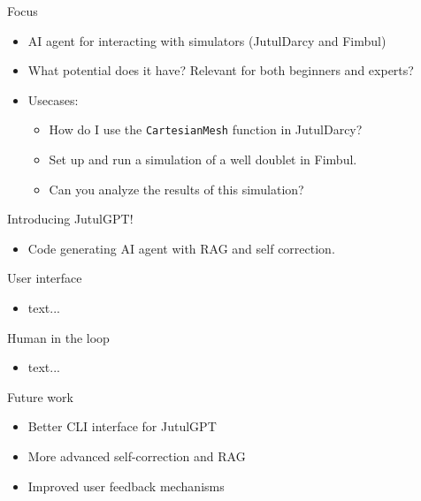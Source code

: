 \begin{frame}{Focus}
  \begin{itemize}
    \item AI agent for interacting with simulators (JutulDarcy and Fimbul)
    \item What potential does it have? Relevant for both beginners and experts?
    \item Usecases:
      \begin{itemize}
        \item How do I use the \texttt{CartesianMesh} function in JutulDarcy?
        \item Set up and run a simulation of a well doublet in Fimbul.
        \item Can you analyze the results of this simulation?
      \end{itemize}
  \end{itemize}
\end{frame}

\begin{frame}{Introducing JutulGPT!}
  \begin{itemize}
    \item Code generating AI agent with RAG and self correction.
  \end{itemize}
\end{frame}

\begin{frame}{User interface}
  \begin{itemize}
    \item text...
  \end{itemize}
\end{frame}

\begin{frame}{Human in the loop}
  \begin{itemize}
    \item text...
  \end{itemize}
\end{frame}

\begin{frame}{Future work}
  \begin{itemize}
    \item Better CLI interface for JutulGPT
    \item More advanced self-correction and RAG
    \item Improved user feedback mechanisms
  \end{itemize}
\end{frame}